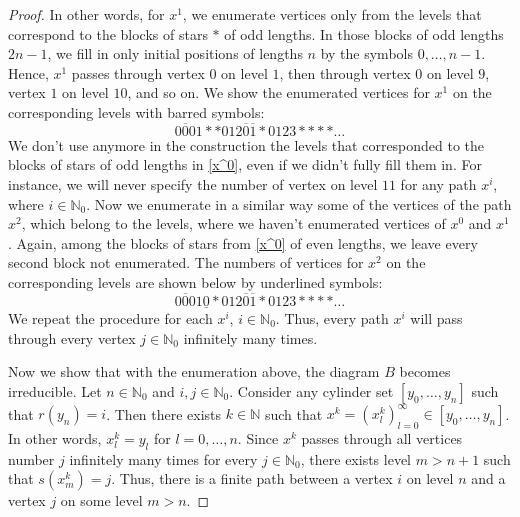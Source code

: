 \documentclass[11pt, twoside]{amsart}
\theoremstyle{definition}
\theoremstyle{remark}
\theoremstyle{plain}
\newcommand{\tcr}{\textcolor{red}}
\def\ov{\overline}
\newcommand{\N}{\mathbb N}
\numberwithin{equation}{section}
\begin{document}
\begin{proof}
In other words, for $x^1$, we enumerate vertices only from the levels that correspond to the blocks of stars $*$ of odd lengths. In those blocks of odd lengths $2n-1$, we fill in only initial positions of lengths $n$ by the symbols $0, \ldots, n-1$. Hence, $x^1$ passes through vertex $0$ on level $1$, then through vertex $0$ on level $9$, vertex $1$ on level $10$, and so on. We show the enumerated vertices for $x^1$ on the corresponding levels with barred symbols:
$$
0\ov{0}01**012\ov{0}\ov{1}*0123****\ldots
$$
We don't use anymore in the construction the levels that corresponded to the blocks of stars of odd lengths in \eqref{x^0}, even if we didn't fully fill them in. For instance, we will never specify the number of vertex on level $11$ for any path $x^i$, where $i \in \N_0$. 
Now we enumerate in a similar way some of the vertices of the path $x^2$, which belong to the levels, where we haven't enumerated vertices of $x^0$ and $x^1$. Again, among the blocks of stars from \eqref{x^0} of even lengths, we leave every second block not enumerated. The numbers of vertices for $x^2$ on the corresponding levels are shown below by underlined symbols:
$$
0\ov{0}01\underline{0}*012\ov{0}\ov{1}*0123****\ldots
$$
We repeat the procedure for each $x^i$, $i \in \N_0$. Thus, every path $x^i$ will pass through every vertex $j \in \N_0$ infinitely many times.

Now we show that with the enumeration above, the diagram $B$ becomes irreducible.
Let $n \in \N_0$ and $i,j \in \N_0$. Consider any cylinder set $[y_0, \ldots, y_n]$ such that $r(y_n) = i$. 
Then there exists $k \in \N$ such that $x^k = (x^k_l)_{l=0}^{\infty} \in [y_0, \ldots, y_n]$. In other words, $x^k_l = y_l$ for $l = 0, \ldots, n$. 
Since $x^k$ passes through all vertices number $j$ infinitely many times for every $j \in \N_0$, there exists level $m > n+1$ such that $s(x^k_m) = j$. Thus, there is a finite path between a vertex $i$ on level $n$ and a vertex $j$ on some level $m > n$.
\end{proof}
\end{document}
